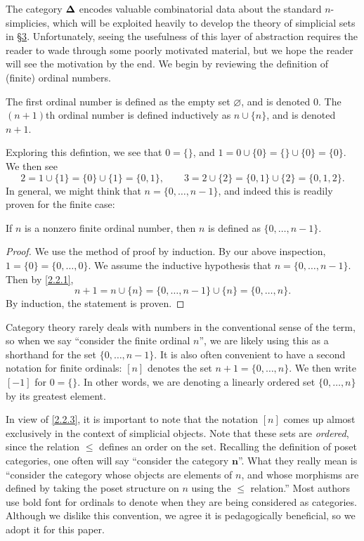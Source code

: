 The category $\boldsymbol{\Delta}$ encodes valuable combinatorial data about the standard $n$-simplicies, which will be exploited heavily to develop the theory of simplicial sets in \href{sec3}{\S3}. Unfortunately, seeing the usefulness of this layer of abstraction requires the reader to wade through some poorly motivated material, but we hope the reader will see the motivation by the end. We begin by reviewing the definition of (finite) ordinal numbers.

\begin{definition}\label{2.2.1}
    The first ordinal number is defined as the empty set $\varnothing$, and is denoted $0$. The $(n+1)$th ordinal number is defined inductively as $n\cup \{n\}$, and is denoted $n+1$.
\end{definition}

Exploring this defintion, we see that $0=\{\}$, and $1=0\cup\{0\}=\{\}\cup\{0\}=\{0\}$. We then see
\[
2 = 1\cup\{1\}=\{0\}\cup\{1\}=\{0,1\},\qquad 3=2\cup\{2\}=\{0,1\}\cup\{2\}=\{0,1,2\}.
\]
In general, we might think that $n=\{0,\ldots,n-1\}$, and indeed this is readily proven for the finite case:

\begin{proposition}\label{2.2.2}
    If $n$ is a nonzero finite ordinal number, then $n$ is defined as $\{0,\ldots,n-1\}$.
\end{proposition}
\begin{proof}
    We use the method of proof by induction. By our above inspection, $1=\{0\}=\{0,\ldots,0\}$. We assume the inductive hypothesis that $n=\{0,\ldots,n-1\}$. Then by \cref{2.2.1},
    \[
    n+1=n\cup\{n\}=\{0,\ldots,n-1\}\cup\{n\}=\{0,\ldots,n\}.
    \]
    By induction, the statement is proven.
\end{proof}

\begin{notation}\label{2.2.3}
Category theory rarely deals with numbers in the conventional sense of the term, so when we say ``consider the finite ordinal $n$'', we are likely using this as a shorthand for the set $\{0,\ldots,n-1\}$. It is also often convenient to have a second notation for finite ordinals: $[n]$ denotes the set $n+1=\{0,\ldots,n\}$. We then write $[-1]$ for $0=\{\}$. In other words, we are denoting a linearly ordered set $\{0,\ldots,n\}$ by its greatest element.
\end{notation}

\begin{remark}\label{2.2.4}
    In view of \cref{2.2.3}, it is important to note that the notation $[n]$ comes up almost exclusively in the context of simplicial objects. Note that these sets are \emph{ordered}, since the relation $\leq$ defines an order on the set. Recalling the definition of poset categories, one often will say ``consider the category $\mathbf{n}$''. What they really mean is ``consider the category whose objects are elements of $n$, and whose morphisms are defined by taking the poset structure on $n$ using the $\leq$ relation.'' Most authors use bold font for ordinals to denote when they are being considered as categories. Although we dislike this convention, we agree it is pedagogically beneficial, so we adopt it for this paper.
\end{remark}

